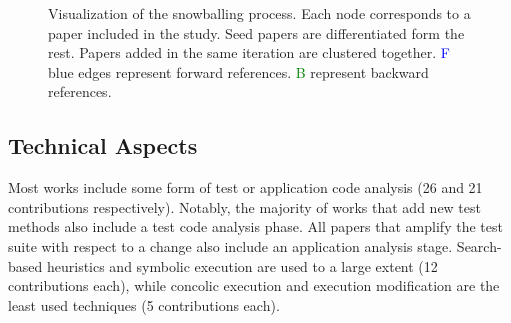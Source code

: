\begin{figure}
	\centering
	\caption{Visualization of the snowballing process. Each node corresponds to a paper included in the study. Seed papers are differentiated form the rest. Papers added in the same iteration are clustered together. \textcolor{blue}{F} blue edges represent forward references. \textcolor{green}{B} represent backward references.}
	\label{fig:citation_graph}
\end{figure}

\subsection{Technical Aspects}
\label{subsec:sota:analysis:technical-aspects}

Most works include some form of test or application code analysis (26 and 21 contributions respectively). 
Notably, the majority of works that add new test methods also include a test code analysis phase. 
All papers that amplify the test suite with respect to a change also include an application analysis stage. 
Search-based heuristics and symbolic execution are used to a large extent (12 contributions each), while concolic execution and execution modification are the least used techniques (5 contributions each).


